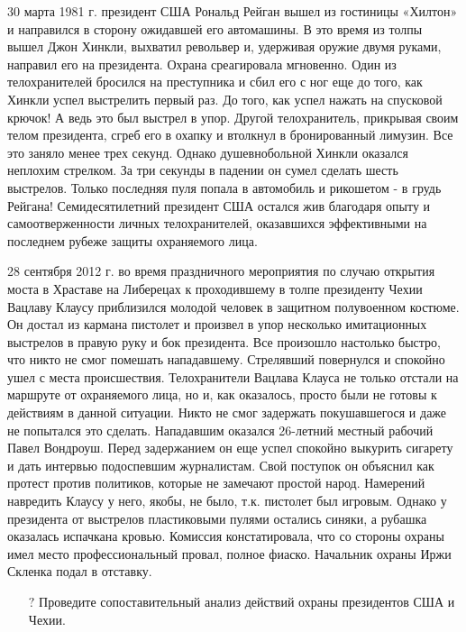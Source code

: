 \documentclass[a4paper,12pt,fleqn]{article} %
\begin{document}
\begin{tcolorbox}[colback=blue!55!red!5!,colframe=blue!55!red,enforce breakable,%
	pad at break=1mm, title=Кейс 29. Инциденты при охране физических лиц]

	30 марта 1981 г. президент США Рональд Рейган вышел из гостиницы «Хилтон» и направился в сторону ожидавшей его автомашины. В это время из толпы вышел Джон Хинкли, выхватил револьвер и, удерживая оружие двумя руками, направил его на президента. Охрана среагировала мгновенно. Один из телохранителей бросился на преступника и сбил его с ног еще до того, как Хинкли успел выстрелить первый раз. До того, как успел нажать на спусковой крючок! А ведь это был выстрел в упор. Другой телохранитель, прикрывая своим телом президента, сгреб его в охапку и втолкнул в бронированный лимузин. Все это заняло менее трех секунд. Однако душевнобольной Хинкли оказался неплохим стрелком. За три секунды в падении он сумел сделать шесть выстрелов. Только последняя пуля попала в автомобиль и рикошетом - в грудь Рейгана! Семидесятилетний президент США остался жив благодаря опыту и самоотверженности личных телохранителей, оказавшихся эффективными на последнем рубеже защиты охраняемого лица. 
	
	28 сентября 2012 г. во время праздничного мероприятия по случаю открытия моста в Храставе на Либерецах к проходившему в толпе президенту Чехии Вацлаву Клаусу приблизился молодой человек в защитном полувоенном костюме. Он достал из кармана пистолет и произвел в упор несколько имитационных выстрелов в правую руку и бок президента. Все произошло настолько быстро, что никто не смог помешать нападавшему. Стрелявший повернулся и спокойно ушел с места происшествия. Телохранители Вацлава Клауса не только отстали на маршруте от охраняемого лица, но и, как оказалось, просто были не готовы к действиям в данной ситуации. Никто не смог задержать покушавшегося и даже не попытался это сделать. Нападавшим оказался 26-летний местный рабочий Павел Вондроуш. Перед задержанием он еще успел спокойно выкурить сигарету и дать интервью подоспевшим журналистам. Свой поступок он объяснил как протест против политиков, которые не замечают простой народ. Намерений навредить Клаусу у него, якобы, не было, т.к. пистолет был игровым. Однако у президента от выстрелов пластиковыми пулями остались синяки, а рубашка оказалась испачкана кровью. Комиссия констатировала, что со стороны охраны имел место профессиональный провал, полное фиаско. Начальник охраны Иржи Скленка подал в отставку.

\begin{itemize}
	\item[{\color{blue!55!red}\Huge {  $ ? $}} \quad]   Проведите сопоставительный анализ действий охраны президентов США и Чехии.
\end{itemize}	

\end{tcolorbox}
\end{document}
